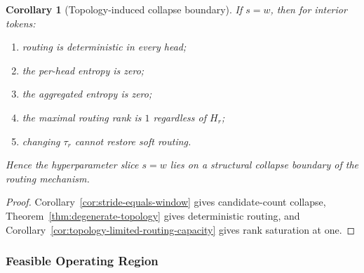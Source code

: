 \documentclass{article}
\theoremstyle{plain}
\newtheorem{corollary}[theorem]{Corollary}
\theoremstyle{definition}
\theoremstyle{remark}
\begin{document}
\begin{corollary}[Topology-induced collapse boundary]
\label{cor:topology-collapse-boundary}
If $s=w$, then for interior tokens:
\begin{enumerate}
    \item routing is deterministic in every head;
    \item the per-head entropy is zero;
    \item the aggregated entropy is zero;
    \item the maximal routing rank is $1$ regardless of $H_r$;
    \item changing $\tau_r$ cannot restore soft routing.
\end{enumerate}
Hence the hyperparameter slice $s=w$ lies on a structural collapse boundary of the routing mechanism.
\end{corollary}

\begin{proof}
Corollary~\ref{cor:stride-equals-window} gives candidate-count collapse, Theorem~\ref{thm:degenerate-topology} gives deterministic routing, and Corollary~\ref{cor:topology-limited-routing-capacity} gives rank saturation at one.
\end{proof}

\subsubsection{Feasible Operating Region}
\label{sec:tier-c-feasible-region}
\end{document}
